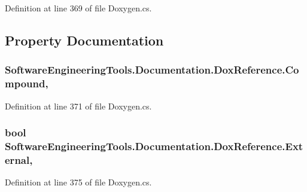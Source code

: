 Definition at line 369 of file Doxygen.\+cs.



\subsection{Property Documentation}
\hypertarget{class_software_engineering_tools_1_1_documentation_1_1_dox_reference_af1adff120d9414e232e8d95edcb3a206}{
\subsubsection[{Compound}]{ Software\+Engineering\+Tools.\+Documentation.\+Dox\+Reference.\+Compound\hspace{0.3cm}{\ttfamily [get]}, {\ttfamily [set]}}}\label{class_software_engineering_tools_1_1_documentation_1_1_dox_reference_af1adff120d9414e232e8d95edcb3a206}


Definition at line 371 of file Doxygen.\+cs.

\hypertarget{class_software_engineering_tools_1_1_documentation_1_1_dox_reference_ac5ed2eb3dd985eab60870b9c08d4f372}{
\subsubsection[{External}]{\setlength{\rightskip}{0pt plus 5cm}bool Software\+Engineering\+Tools.\+Documentation.\+Dox\+Reference.\+External\hspace{0.3cm}{\ttfamily [get]}, {\ttfamily [set]}}}\label{class_software_engineering_tools_1_1_documentation_1_1_dox_reference_ac5ed2eb3dd985eab60870b9c08d4f372}


Definition at line 375 of file Doxygen.\+cs.

